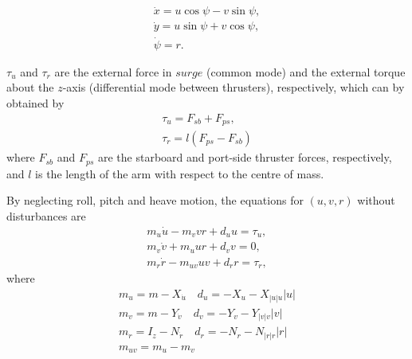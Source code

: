 \begin{equation}
    \begin{gathered}
        \dot{x} = u \cos \psi - v \sin \psi, \\
        \dot{y} = u \sin \psi + v \cos \psi, \\
        \dot{\psi} = r.
    \end{gathered}
\end{equation}
\par $\tau_u$ and $\tau_r$ are the external force in $surge$ (common mode) and the external torque about the $z$-axis (differential mode between thrusters), respectively, which can by obtained by 
\begin{equation}
    \begin{gathered}
        \tau_u = F_{sb} + F_{ps}, \\
        \tau_r = l(F_{ps} - F_{sb})
    \end{gathered}
    \label{eq:simple_medusa_kinematics}
\end{equation}
where $F_{sb}$ and $F_{ps}$ are the starboard and port-side thruster forces, respectively, and $l$ is the length of the arm with respect to the centre of mass.
\par By neglecting roll, pitch and heave motion, the equations for $(u,v,r)$ without disturbances are
\begin{equation} 
    \begin{gathered}
        m_u\dot{u} - m_v v r + d_u u = \tau_u, \\
        m_v \dot{v} + m_u u r + d_v v = 0, \\
        m_r \dot{r} - m_{uv} u v + d_r r = \tau_r,
    \end{gathered}
    \label{eq:simple_medusa_dynamics}
\end{equation}
where
\begin{equation}
    \begin{gathered}
        m_u = m - X_{\dot{u}} \quad d_u = - X_u - X_{|u|u} |u| \\
        m_v = m - Y_{\dot{v}} \quad d_v = - Y_v - Y_{|v|v}|v| \\
        m_r = I_z - N_{\dot{r}} \quad d_r = - N_r - N_{|r|r}|r| \\
        m_{uv} = m_u - m_v
    \end{gathered}
    \label{eq:medusa_masses_and_drags}
\end{equation}


